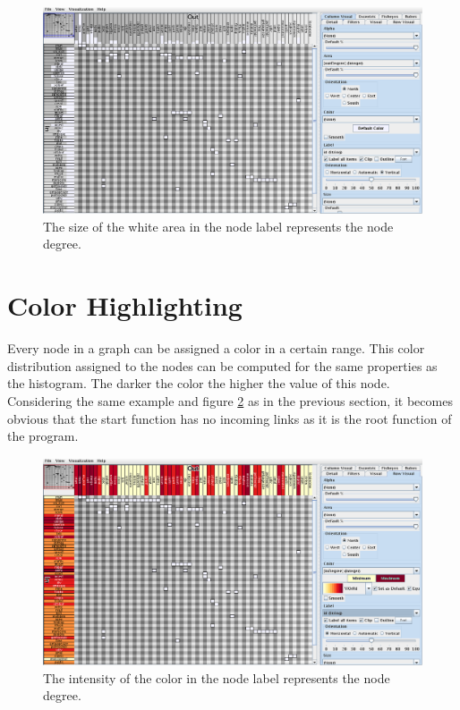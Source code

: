 \begin{figure}[tp]
  \centering
  \includegraphics[keepaspectratio,width=\hsize,height=\halfh]
  {images/Header_MatrixExplorer_histogram.png}
  
  \caption[Matrix Header with Histogram of Node Degree]{
  The size of the white area in the node label represents the node degree.
  }
  \label{fig:header_matrixexplorer_histogram}
\end{figure}

\section{Color Highlighting}
Every node in a graph can be assigned a color in a certain range. This color distribution assigned to the nodes can be computed for the same properties as the histogram. The darker the color the higher the value of this node. Considering the same example and figure \ref{fig:header_matrixexplorer_color} as in the previous section, it becomes obvious that the start function has no incoming links as it is the root function of the program.

\begin{figure}[tp]
  \centering
  \includegraphics[keepaspectratio,width=\hsize,height=\halfh]
  {images/Header_MatrixExplorer_color.png}
  
  \caption[Matrix Header with Color Representation of Node Degree]{
  The intensity of the color in the node label represents the node degree.
  }
  \label{fig:header_matrixexplorer_color}
\end{figure}

